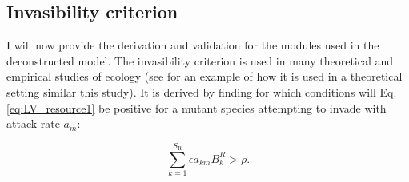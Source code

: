 \documentclass[a4paper]{report}
\begin{document}
\subsection{Invasibility criterion} \label{sec:inv}

I will now provide the derivation and validation for the modules used in the deconstructed model. The invasibility criterion is used in many theoretical and empirical studies of ecology (see \citep{Pawar2009} for an example of how it is used in a theoretical setting similar this study). It is derived by finding for which conditions will Eq. \eqref{eq:LV_resource1} be positive for a mutant species attempting to invade with attack rate $a_{m}$:

\begin{equation}
\sum_{k=1}^{S_{\mathrm{R}}}\epsilon a_{km}B_{k}^{R}>\rho. \label{eq:invadability_criterion_2}
\end{equation}
\end{document}
